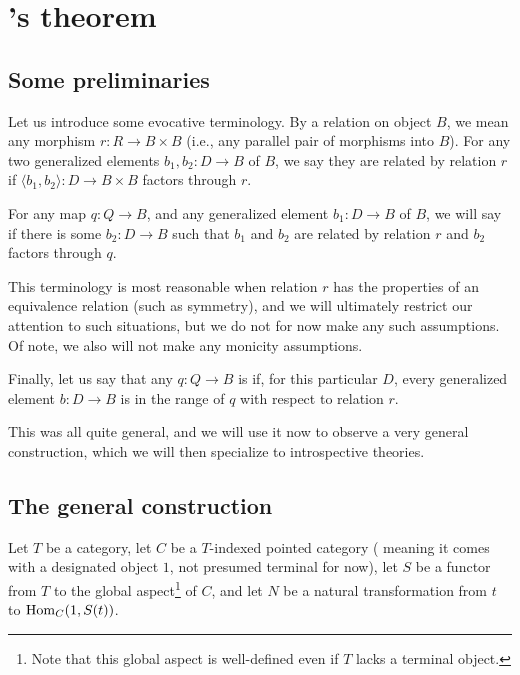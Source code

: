 \section{\Loeb's theorem}

\subsection{Some preliminaries}

Let us introduce some evocative terminology. By a relation on object $B$, we mean any morphism $r : R \to B \times B$ (i.e., any parallel pair of morphisms into $B$). For any two generalized elements $b_1, b_2 : D \to B$ of $B$, we say they are related by relation $r$ if $\langle b_1, b_2 \rangle : D \to B \times B$ factors through $r$.

For any map $q: Q \to B$, and any generalized element $b_1 : D \to B$ of $B$, we will say  if there is some $b_2 : D \to B$ such that $b_1$ and $b_2$ are related by relation $r$ and $b_2$ factors through $q$.

This terminology is most reasonable when relation $r$ has the properties of an equivalence relation (such as symmetry), and we will ultimately restrict our attention to such situations, but we do not for now make any such assumptions. Of note, we also will not make any monicity assumptions.

Finally, let us say that any $q : Q \to B$ is  if, for this particular $D$, every generalized element $b : D \to B$ is in the range of $q$ with respect to relation $r$.

This was all quite general, and we will use it now to observe a very general construction, which we will then specialize to introspective theories.

\subsection{The general construction}
\begin{construction}\label{GeneralDiag}
\end{construction}
Let $T$ be a category, let $C$ be a $T$-indexed pointed category ( meaning it comes with a designated object $1$, not presumed terminal for now), let $S$ be a functor from $T$ to the global aspect\footnote{Note that this global aspect is well-defined even if $T$ lacks a terminal object.} of $C$, and let $N$ be a natural transformation from $t$ to $\operatorname{Hom}_C(1, S(t))$.

